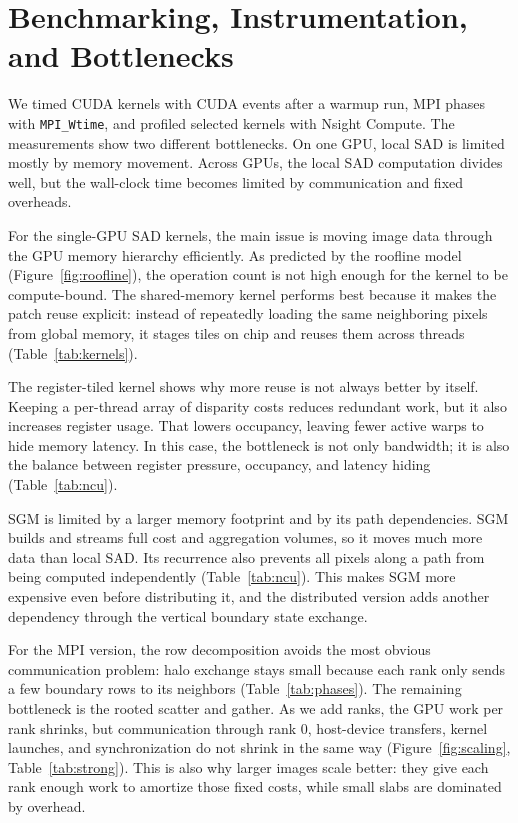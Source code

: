 \documentclass[11pt]{article}
\begin{document}
\section{Benchmarking, Instrumentation, and Bottlenecks}
\label{sec:bottlenecks}

We timed CUDA kernels with CUDA events after a warmup run, MPI phases with \texttt{MPI\_Wtime}, and profiled selected kernels with Nsight Compute. The measurements show two different bottlenecks. On one GPU, local SAD is limited mostly by memory movement. Across GPUs, the local SAD computation divides well, but the wall-clock time becomes limited by communication and fixed overheads.

For the single-GPU SAD kernels, the main issue is moving image data through the
GPU memory hierarchy efficiently. As predicted by the roofline model
(Figure~\ref{fig:roofline}), the operation count is not high enough for the
kernel to be compute-bound. The shared-memory kernel performs best because it
makes the patch reuse explicit: instead of repeatedly loading the same
neighboring pixels from global memory, it stages tiles on chip and reuses them
across threads (Table~\ref{tab:kernels}).

The register-tiled kernel shows why more reuse is not always better by itself.
Keeping a per-thread array of disparity costs reduces redundant work, but it also
increases register usage. That lowers occupancy, leaving fewer active warps to
hide memory latency. In this case, the bottleneck is not only bandwidth; it is
also the balance between register pressure, occupancy, and latency hiding
(Table~\ref{tab:ncu}).

SGM is limited by a larger memory footprint and by its path dependencies. SGM
builds and streams full cost and aggregation volumes, so it moves much more data
than local SAD. Its recurrence also prevents all pixels along a path from being
computed independently (Table~\ref{tab:ncu}). This makes SGM more expensive
even before distributing it, and the distributed version adds another dependency
through the vertical boundary state exchange.

For the MPI version, the row decomposition avoids the most obvious communication
problem: halo exchange stays small because each rank only sends a few boundary
rows to its neighbors (Table~\ref{tab:phases}). The remaining bottleneck is the
rooted scatter and gather. As we add ranks, the GPU work per rank shrinks, but
communication through rank 0, host-device transfers, kernel launches, and
synchronization do not shrink in the same way (Figure~\ref{fig:scaling},
Table~\ref{tab:strong}). This is also why larger images scale better: they give
each rank enough work to amortize those fixed costs, while small slabs are
dominated by overhead.
\end{document}

